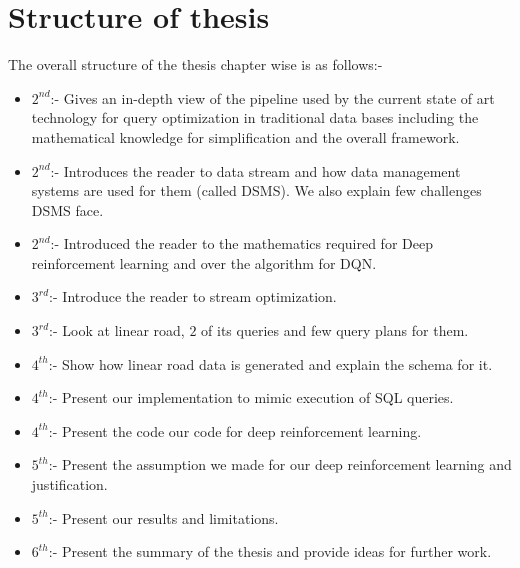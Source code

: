 \section{Structure of thesis}
\label{sec:Structure of thesis}
The overall structure of the thesis chapter wise is as follows:-
\begin{itemize}
    \item $2^{nd}$:- Gives an in-depth view of the pipeline used by the current state of art technology for query optimization in traditional data bases including the mathematical knowledge for simplification and the overall framework.
    \item $2^{nd}$:- Introduces the reader to data stream and how data management systems are used for them (called DSMS). We also explain few challenges DSMS face.
    \item $2^{nd}$:- Introduced the reader to the mathematics required for Deep reinforcement learning and over the algorithm for DQN.
    \item $3^{rd}$:- Introduce the reader to stream optimization.
    \item $3^{rd}$:- Look at linear road, $2$ of its queries and few query plans for them.
    \item $4^{th}$:- Show how linear road data is generated and explain the schema for it.
    \item $4^{th}$:- Present our implementation to mimic execution of SQL queries.
    \item $4^{th}$:- Present the code our code for deep reinforcement learning.
    \item $5^{th}$:- Present the assumption we made for our deep reinforcement learning and justification.
    \item $5^{th}$:- Present our results and limitations.
    \item $6^{th}$:- Present the summary of the thesis and provide ideas for further work.
\end{itemize}

